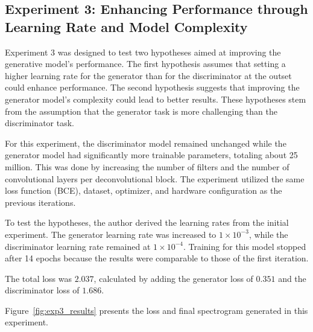 \subsection{Experiment 3: Enhancing Performance through Learning Rate and Model Complexity}

Experiment 3 was designed to test two hypotheses aimed at improving the generative model's performance. The first hypothesis assumes that setting a higher learning rate for the generator than for the discriminator at the outset could enhance performance. The second hypothesis suggests that improving the generator model's complexity could lead to better results. These hypotheses stem from the assumption that the generator task is more challenging than the discriminator task.

For this experiment, the discriminator model remained unchanged while the generator model had significantly more trainable parameters, totaling about 25 million. This was done by increasing the number of filters and the number of convolutional layers per deconvolutional block. The experiment utilized the same loss function (\ac{BCE}), dataset, optimizer, and hardware configuration as the previous iterations.

To test the hypotheses, the author derived the learning rates from the initial experiment. The generator learning rate was increased to $1 \times 10^{-3}$, while the discriminator learning rate remained at $1 \times 10^{-4}$. Training for this model stopped after 14 epochs because the results were comparable to those of the first iteration.

The total loss was $2.037$, calculated by adding the generator loss of $0.351$ and the discriminator loss of $1.686$.

Figure~\ref{fig:exp3_results} presents the loss and final spectrogram generated in this experiment.

